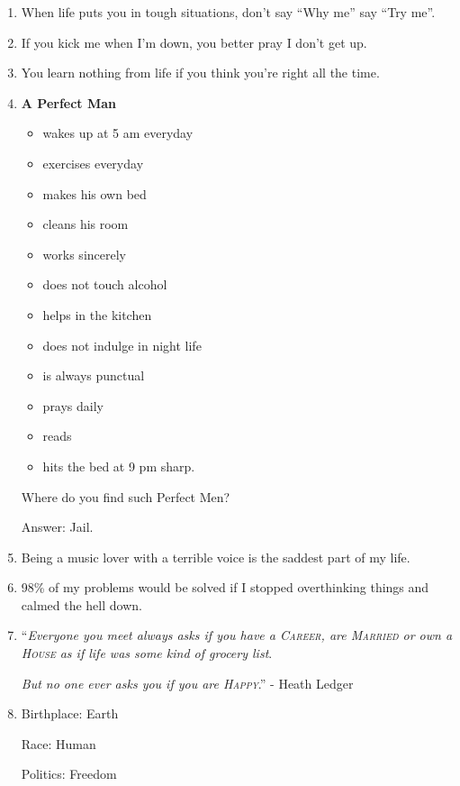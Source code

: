 \documentclass{article}
\numberwithin{equation}{section}
\begin{document}
\begin{enumerate}
    \textit{But the only way to be beautiful is \textbf{to be loving}}.
    
    \textit{Otherwise, it's just ``Congratulations about your face.''}.'' - John Mayer
    \item When life puts you in tough situations, don't say ``Why me'' say ``Try me''.
    \item If you kick me when I'm down, you better pray I don't get up.
    \item You learn nothing from life if you think you're right all the time.
    \item \textbf{A Perfect Man}
    \begin{itemize}
        \item wakes up at 5 am everyday
        \item exercises everyday
        \item makes his own bed
        \item cleans his room
        \item works sincerely
        \item does not touch alcohol
        \item helps in the kitchen
        \item does not indulge in night life
        \item is always punctual
        \item prays daily
        \item reads
        \item hits the bed at 9 pm sharp.
    \end{itemize}
    Where do you find such Perfect Men?
    
    Answer: Jail.
    \item Being a music lover with a terrible voice is the saddest part of my life.
    \item 98\% of my problems would be solved if I stopped overthinking things and calmed the hell down.
    \item ``\textit{Everyone you meet always asks if you have a \textsc{Career}, are \textsc{Married} or own a \textsc{House} as if life was some kind of grocery list}.
    
    \textit{But no one ever asks you if you are \textsc{Happy}}.'' - Heath Ledger
    \item Birthplace: Earth
    
    Race: Human
    
    Politics: Freedom
    

\end{enumerate}
\end{document}
